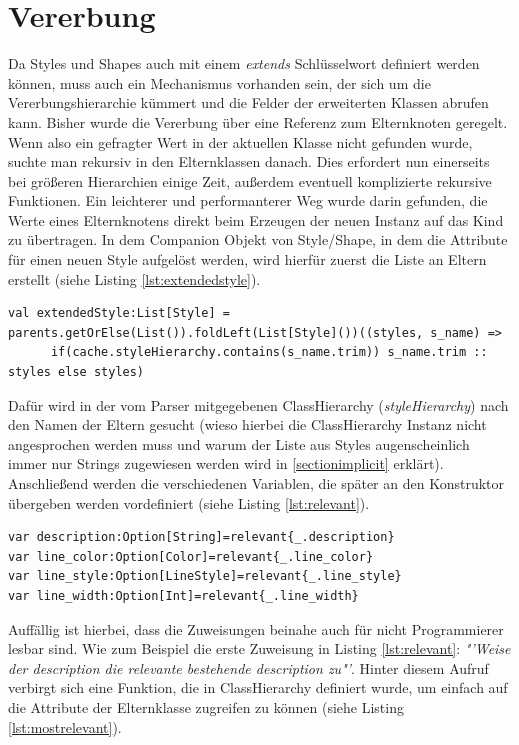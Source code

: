 \section{Vererbung}\label{sectionInheritance}
Da Styles und Shapes auch mit einem \textit{extends} Schlüsselwort definiert werden können, muss auch ein Mechanismus vorhanden sein, der sich um die Vererbungshierarchie kümmert und die Felder der erweiterten Klassen abrufen kann.
Bisher wurde die Vererbung über eine Referenz zum Elternknoten geregelt. Wenn also ein gefragter Wert in der aktuellen Klasse nicht gefunden wurde, suchte man rekursiv in den Elternklassen danach.
Dies erfordert nun einerseits bei größeren Hierarchien einige Zeit, außerdem eventuell komplizierte rekursive Funktionen.
Ein leichterer und performanterer Weg wurde darin gefunden, die Werte eines Elternknotens direkt beim Erzeugen der neuen Instanz auf das Kind zu übertragen.
In dem Companion Objekt von Style/Shape, in dem die Attribute für einen neuen Style aufgelöst werden, wird hierfür zuerst die Liste an Eltern erstellt (siehe Listing \ref{lst:extendedstyle}).
\begin{lstlisting}[style=scala, caption = {Auszug aus Code sammeln der Elterninstanzen}, label = {lst:extendedstyle}]
val extendedStyle:List[Style] = parents.getOrElse(List()).foldLeft(List[Style]())((styles, s_name) =>
      if(cache.styleHierarchy.contains(s_name.trim)) s_name.trim :: styles else styles)
\end{lstlisting}Dafür wird in der vom Parser mitgegebenen ClassHierarchy (\textit{styleHierarchy}) nach den Namen der Eltern gesucht (wieso hierbei die ClassHierarchy Instanz nicht angesprochen werden muss und warum der Liste aus Styles augenscheinlich immer nur Strings zugewiesen werden wird in \ref{sectionimplicit} erklärt).
Anschließend werden die verschiedenen Variablen, die später an den Konstruktor übergeben werden vordefiniert (siehe Listing \ref{lst:relevant}).
\begin{lstlisting}[style=scala, caption = {Auszug aus Code Zuweisung der Felder der Elternelemente}, label = {lst:relevant}]
var description:Option[String]=relevant{_.description}
var line_color:Option[Color]=relevant{_.line_color}
var line_style:Option[LineStyle]=relevant{_.line_style}
var line_width:Option[Int]=relevant{_.line_width}
\end{lstlisting}Auffällig ist hierbei, dass die Zuweisungen beinahe auch für nicht Programmierer lesbar sind. Wie zum Beispiel die erste Zuweisung in Listing \ref{lst:relevant}: \textit{"'Weise der description die relevante bestehende description zu"'}. Hinter diesem Aufruf verbirgt sich eine Funktion, die in ClassHierarchy definiert wurde, um einfach auf die Attribute der Elternklasse zugreifen zu können (siehe Listing \ref{lst:mostrelevant}).
